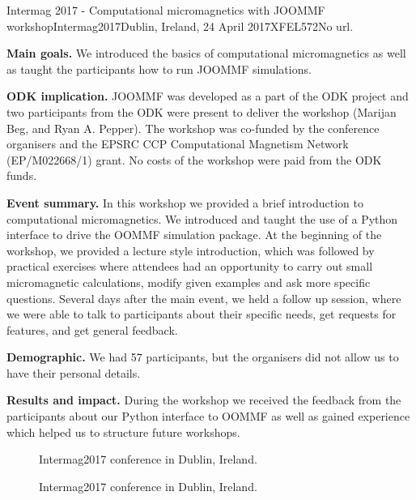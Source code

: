\begin{event}{Intermag 2017 - Computational micromagnetics with JOOMMF workshop}{Intermag2017}{Dublin, Ireland, 24 April 2017}{XFEL}{57}{2}{No url.}

\textbf{Main goals.} We introduced the basics of computational micromagnetics as well as taught the participants how to run JOOMMF simulations.

\textbf{ODK implication.} JOOMMF was developed as a part of the ODK project and two participants from the ODK were present to deliver the workshop (Marijan Beg, and Ryan A. Pepper). The workshop was co-funded by the conference organisers and the EPSRC CCP Computational Magnetism Network (EP/M022668/1) grant. No costs of the workshop were paid from the ODK funds.

\textbf{Event summary.} In this workshop we provided a brief introduction to computational micromagnetics. We introduced and taught the use of a Python interface to drive the OOMMF simulation package. At the beginning of the workshop, we provided a lecture style introduction, which was followed by practical exercises where attendees had an opportunity to carry out small micromagnetic calculations, modify given examples and ask more specific questions. Several days after the main event, we held a follow up session, where we were able to talk to participants about their specific needs, get requests for features, and get general feedback.

\textbf{Demographic.} We had 57 participants, but the organisers did not allow us to have their personal details.

\textbf{Results and impact.} During the workshop we received the feedback from the participants about our Python interface to OOMMF as well as gained experience which helped us to structure future workshops.

\begin{figure}[ht]

\caption*{Intermag2017 conference in Dublin, Ireland.}
\end{figure}

\begin{figure}[ht]

\caption*{Intermag2017 conference in Dublin, Ireland.}
\end{figure}

\end{event}
